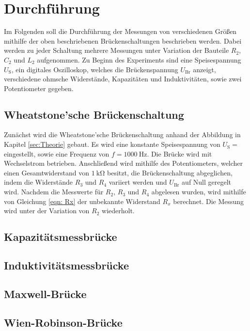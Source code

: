 \section{Durchführung} \label{sec:Durchführung}

    Im Folgenden soll die Durchführung der Messungen von verschiedenen Größen mithilfe der oben beschriebenen
    Brückenschaltungen beschrieben werden.
    Dabei werden zu jeder Schaltung mehrere Messungen unter Variation der Bauteile
    $R_2$, $C_2$ und $L_2$ aufgenommen.
    Zu Beginn des Experiments sind eine Speisespannung $U_\text{S}$, ein digitales Oszilloskop, welches die
    Brückenspannung $U_\text{Br}$ anzeigt, verschiedene ohmsche Widerstände, Kapazitäten und Induktivitäten, sowie
    zwei Potentiometer gegeben.

\subsection{Wheatstone'sche Brückenschaltung}

    Zunächst wird die Wheatstone'sche Brückenschaltung anhand der Abbildung in Kapitel \ref{sec:Theorie} gebaut.
    Es wird eine konstante Speisespannung von $U_\text{S} = $ eingestellt, sowie eine Frequenz von $f = \SI{1000}{\hertz}$.
    Die Brücke wird mit Wechselstrom betrieben.
    Anschließend wird mithilfe des Potentiometers, welcher einen Gesamtwiderstand von $\SI{1}{\kilo\ohm}$ besitzt,
    die Brückenschaltung abgeglichen, indem
    die Widerstände $R_3$ und $R_4$ variiert werden und $U_\text{Br}$ auf Null geregelt wird.
    Nachdem die Messwerte für $R_2$, $R_3$ und $R_4$ abgelesen wurden, wird mithilfe von Gleichung \eqref{eqn: Rx}
    der unbekannte Widerstand $R_x$ berechnet.
    Die Messung wird unter der Variation von $R_2$ wiederholt.


\subsection{Kapazitätsmessbrücke}
\subsection{Induktivitätsmessbrücke}
\subsection{Maxwell-Brücke}
\subsection{Wien-Robinson-Brücke}
